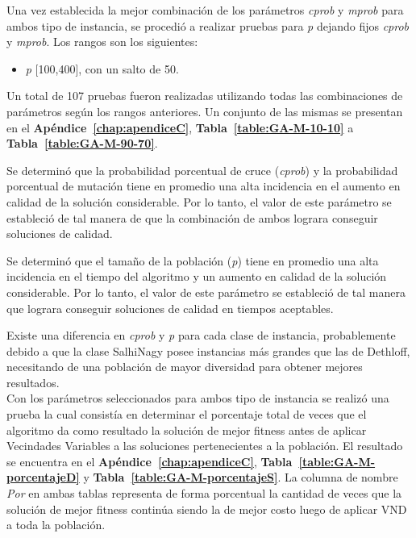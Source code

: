 Una vez establecida la mejor combinación de los parámetros \emph{cprob} y \emph{mprob} para ambos tipo de instancia, se procedió a realizar pruebas para \emph{p} dejando fijos \emph{cprob} y \emph{mprob}. Los rangos son los siguientes:

\begin{itemize}
\item \emph{p} [100,400], con un salto de 50.
\end{itemize}

Un total de 107 pruebas fueron realizadas utilizando todas las combinaciones de parámetros según los rangos anteriores. Un conjunto de las mismas se presentan en el \textbf{Apéndice~\ref{chap:apendiceC}}, 
\textbf{Tabla~\ref{table:GA-M-10-10}} a \textbf{Tabla~\ref{table:GA-M-90-70}}.

Se determinó que la probabilidad porcentual de cruce (\emph{cprob}) y la probabilidad porcentual de mutación tiene en promedio una alta incidencia en el aumento en calidad de la solución considerable. Por lo tanto, el valor de este parámetro se estableció de tal manera de que la combinación de ambos lograra conseguir soluciones de calidad.

Se determinó que el tamaño de la población (\emph{p}) tiene en promedio una alta incidencia en el tiempo del algoritmo y un aumento en calidad de la solución considerable. Por lo tanto, el valor de este parámetro se estableció de tal manera que lograra conseguir soluciones de calidad en tiempos aceptables.

Existe una diferencia en \emph{cprob} y \emph{p} para cada clase de instancia, probablemente debido a que la clase SalhiNagy posee instancias más grandes que las de Dethloff, necesitando de una población de mayor diversidad para obtener mejores resultados.\\

Con los parámetros seleccionados para ambos tipo de instancia se realizó una prueba la cual consistía en determinar el porcentaje total de veces que el algoritmo da como resultado la solución de mejor fitness antes de aplicar Vecindades Variables a las soluciones pertenecientes a la población. El resultado se encuentra en el \textbf{Apéndice~\ref{chap:apendiceC}}, 
\textbf{Tabla~\ref{table:GA-M-porcentajeD}} y \textbf{Tabla~\ref{table:GA-M-porcentajeS}}. La columna de nombre \textit{Por} en ambas tablas representa de forma porcentual la cantidad de veces que la solución de mejor fitness continúa siendo la de mejor costo luego de aplicar VND a toda la población. \\


